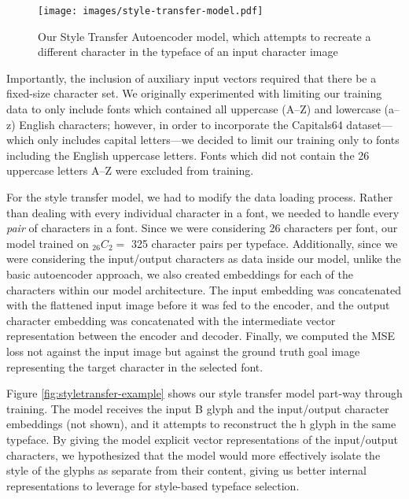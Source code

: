 \begin{figure}[]
    \centering
    \texttt{[image: images/style-transfer-model.pdf]}
    \caption{Our Style Transfer Autoencoder model, which attempts to recreate a different character in the typeface of an input character image}
    \label{fig:style-transfer-model}
\end{figure}

Importantly, the inclusion of auxiliary input vectors required that there be a fixed-size character set. We originally experimented with limiting our training data to only include fonts which contained all uppercase (A--Z) and lowercase (a--z) English characters; however, in order to incorporate the Capitals64 dataset---which only includes capital letters---we decided to limit our training only to fonts including the English uppercase letters. Fonts which did not contain the 26 uppercase letters A--Z were excluded from training.

For the style transfer model, we had to modify the data loading process. Rather than dealing with every individual character in a font, we needed to handle every \textit{pair} of characters in a font. Since we were considering 26 characters per font, our model trained on ${}_{26}C_2 =$ 325 character pairs per typeface. Additionally, since we were considering the input/output characters as data inside our model, unlike the basic autoencoder approach, we also created embeddings for each of the characters within our model architecture. The input embedding was concatenated with the flattened input image before it was fed to the encoder, and the output character embedding was concatenated with the intermediate vector representation between the encoder and decoder. Finally, we computed the MSE loss not against the input image but against the ground truth goal image representing the target character in the selected font.

Figure \ref{fig:styletransfer-example} shows our style transfer model part-way through training. The model receives the input { B} glyph and the input/output character embeddings (not shown), and it attempts to reconstruct the { h} glyph in the same typeface. By giving the model explicit vector representations of the input/output characters, we hypothesized that the model would more effectively isolate the style of the glyphs as separate from their content, giving us better internal representations to leverage for style-based typeface selection.


